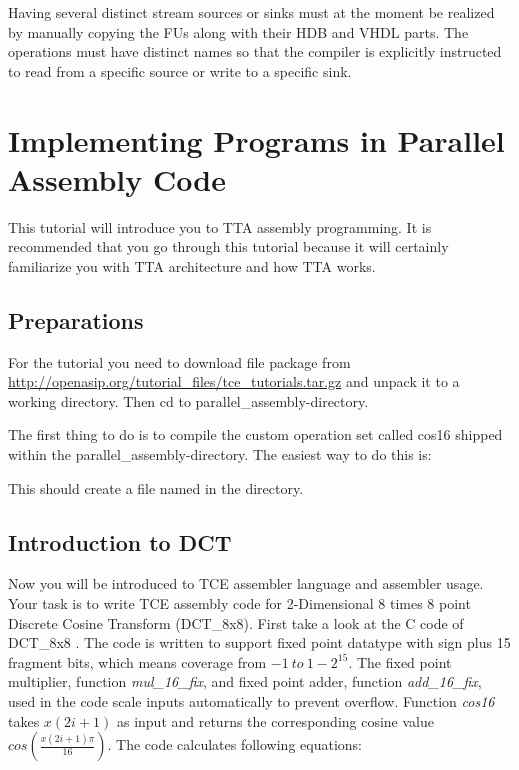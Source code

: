 \documentclass[twoside]{tceusermanual}
\begin{document}
Having several distinct stream sources or sinks must at the moment be realized
by manually copying the FUs along with their HDB and VHDL parts. The operations
must have distinct names so that the compiler is explicitly instructed to read
from a specific source or write to a specific sink.

\section{Implementing Programs in Parallel Assembly Code}
\label{section:parallelAssemblyCoding}

This tutorial will introduce you to TTA assembly programming. It is
recommended that you go through this tutorial because it will certainly
familiarize you with TTA architecture and how TTA works.

\subsection{Preparations}

For the tutorial you need to download file package from
\url{http://openasip.org/tutorial_files/tce_tutorials.tar.gz} and unpack it
to a working directory. Then cd to parallel\_assembly-directory.

The first thing to do is to compile the custom operation set called cos16 shipped
within the parallel\_assembly-directory. The easiest way to do this is:


This should create a file named  in the directory.

\subsection{Introduction to DCT}

Now you will be introduced to TCE assembler language and assembler usage.
Your task is to write TCE assembly code for 2-Dimensional 8 times 8 point 
Discrete Cosine Transform (DCT\_8x8).
First take a look at the C code of DCT\_8x8
.  
The code is written to support fixed point datatype with sign plus 15 fragment
bits, which means coverage from $-1\ to\ 1-2^{15}$. The fixed point
multiplier, function \textit{mul\_16\_fix}, and fixed point adder, function
\textit{add\_16\_fix},  used in the code scale inputs automatically to prevent
overflow. Function \textit{cos16} takes $x(2i+1)$ as input and returns
the corresponding cosine value $cos\left(\frac{x(2i+1)\pi}{16}\right)$. The code calculates
following equations:
\end{document}
